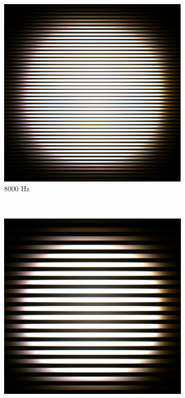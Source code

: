 \begin{figure}[!htb]
\centering
	\begin{subfigure}[h]{0.12\textwidth}
	\includegraphics[width=\textwidth]{fig/strip1.png}
	\caption{8000 Hz}
	\end{subfigure}
	~	
	\begin{subfigure}[h]{0.12\textwidth}
	\includegraphics[width=\textwidth]{fig/strip2.png}

\end{subfigure}
\end{figure}
